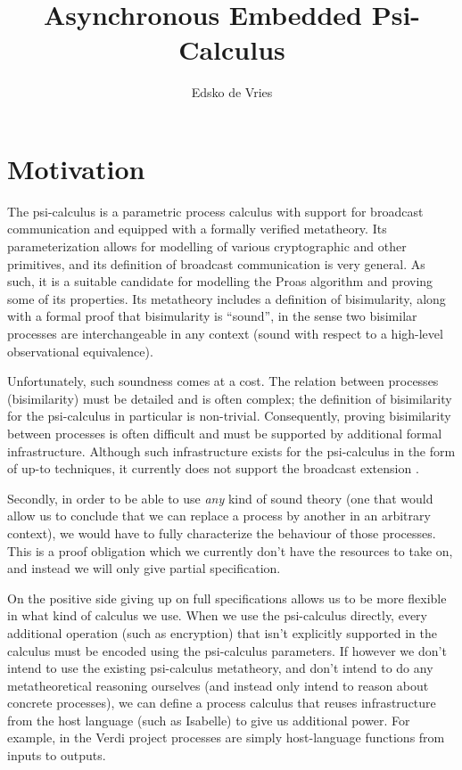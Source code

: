 \documentclass{article}
\newcommand{\psicalculus}{psi-calculus\xspace}
\begin{document}
\title{Asynchronous Embedded Psi-Calculus}
\author{Edsko de Vries}
\maketitle

\section{Motivation}

The \psicalculus \cite{DBLP:journals/corr/abs-1101-3262} is a parametric process
calculus with support for broadcast communication \cite{Borgström2015} and
equipped with a formally verified metatheory. Its parameterization allows for
modelling of various cryptographic and other primitives, and its definition of
broadcast communication is very general. As such, it is a suitable candidate for
modelling the Proas algorithm and proving some of its properties. Its metatheory
includes a definition of bisimularity, along with a formal proof that
bisimularity is ``sound'', in the sense two bisimilar processes are
interchangeable in any context (sound with respect to a high-level observational
equivalence).

Unfortunately, such soundness comes at a cost. The relation between processes
(bisimilarity) must be detailed and is often complex; the definition of
bisimilarity for the \psicalculus in particular is non-trivial. Consequently,
proving bisimilarity between processes is often difficult and must be supported
by additional formal infrastructure. Although such infrastructure exists for the
\psicalculus in the form of up-to techniques, it currently does not support the
broadcast extension \cite{AmanPohjola:2016:BUT:2854065.2854080}.

Secondly, in order to be able to use \emph{any} kind of sound theory (one that
would allow us to conclude that we can replace a process by another in an
arbitrary context), we would have to fully characterize the behaviour of those
processes. This is a proof obligation which we currently don't have the
resources to take on, and instead we will only give partial specification.

On the positive side giving up on full specifications allows us to be more
flexible in what kind of calculus we use. When we use the \psicalculus directly,
every additional operation (such as encryption) that isn't explicitly supported
in the calculus must be encoded using the \psicalculus parameters. If however we
don't intend to use the existing \psicalculus metatheory, and don't intend to do
any metatheoretical reasoning ourselves (and instead only intend to reason about
concrete processes), we can define a process calculus that reuses infrastructure
from the host language (such as Isabelle) to give us additional power. For
example, in the Verdi project \cite{Wilcox:2015:VFI:2737924.2737958} processes
are simply host-language functions from inputs to outputs.
\end{document}
